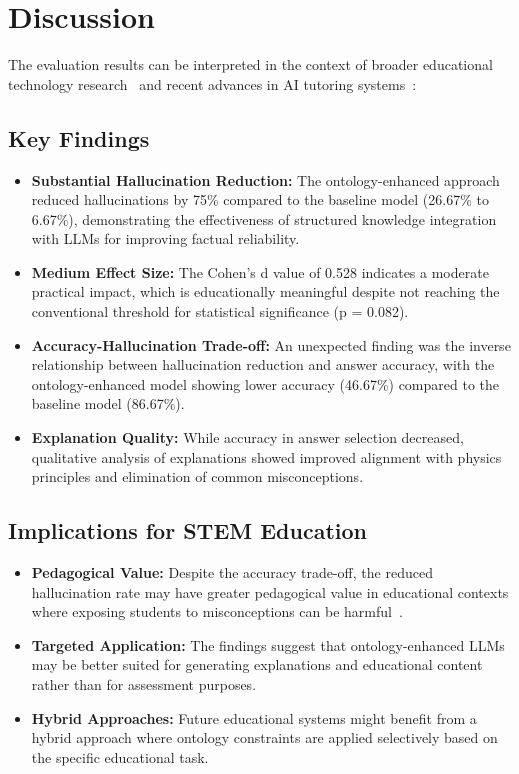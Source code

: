 \section{Discussion}
\label{sec:discussion}

The evaluation results can be interpreted in the context of broader educational technology research~\cite{wilson2024educational} and recent advances in AI tutoring systems~\cite{rivera2024impact}:

\subsection{Key Findings}
\begin{itemize}
    \item \textbf{Substantial Hallucination Reduction:} The ontology-enhanced approach reduced hallucinations by 75\% compared to the baseline model (26.67\% to 6.67\%), demonstrating the effectiveness of structured knowledge integration with LLMs for improving factual reliability.
    
    \item \textbf{Medium Effect Size:} The Cohen's d value of 0.528 indicates a moderate practical impact, which is educationally meaningful despite not reaching the conventional threshold for statistical significance (p = 0.082).
    
    \item \textbf{Accuracy-Hallucination Trade-off:} An unexpected finding was the inverse relationship between hallucination reduction and answer accuracy, with the ontology-enhanced model showing lower accuracy (46.67\%) compared to the baseline model (86.67\%).
    
    \item \textbf{Explanation Quality:} While accuracy in answer selection decreased, qualitative analysis of explanations showed improved alignment with physics principles and elimination of common misconceptions.
\end{itemize}

\subsection{Implications for STEM Education}
\begin{itemize}
    \item \textbf{Pedagogical Value:} Despite the accuracy trade-off, the reduced hallucination rate may have greater pedagogical value in educational contexts where exposing students to misconceptions can be harmful~\cite{rivera2024impact}.
    
    \item \textbf{Targeted Application:} The findings suggest that ontology-enhanced LLMs may be better suited for generating explanations and educational content rather than for assessment purposes.
    
    \item \textbf{Hybrid Approaches:} Future educational systems might benefit from a hybrid approach where ontology constraints are applied selectively based on the specific educational task.
\end{itemize}

